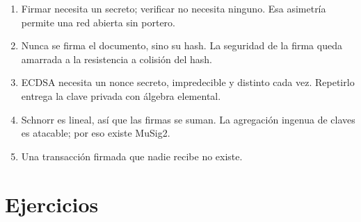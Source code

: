 \documentclass[11pt,a4paper]{article}
\theoremstyle{definition}
\theoremstyle{plain}
\theoremstyle{remark}
\begin{document}
\begin{enumerate}[leftmargin=1.5em]
  \item Firmar necesita un secreto; verificar no necesita ninguno. Esa asimetría
        permite una red abierta sin portero.
  \item Nunca se firma el documento, sino su hash. La seguridad de la firma queda
        amarrada a la resistencia a colisión del hash.
  \item ECDSA necesita un nonce secreto, impredecible y distinto cada vez.
        Repetirlo entrega la clave privada con álgebra elemental.
  \item Schnorr es lineal, así que las firmas se suman. La agregación ingenua de
        claves es atacable; por eso existe MuSig2.
  \item Una transacción firmada que nadie recibe no existe.
\end{enumerate}

\section{Ejercicios}\label{sec:ej}
\end{document}
